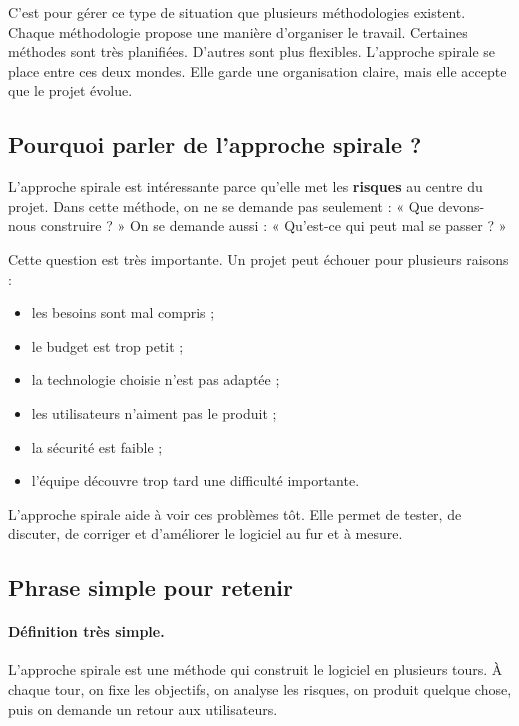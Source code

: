 \documentclass[12pt,a4paper]{article}
\newcommand{\important}[1]{\textbf{#1}}
\begin{document}
C'est pour gérer ce type de situation que plusieurs méthodologies existent. Chaque méthodologie propose une manière d'organiser le travail. Certaines méthodes sont très planifiées. D'autres sont plus flexibles. L'approche spirale se place entre ces deux mondes. Elle garde une organisation claire, mais elle accepte que le projet évolue.

\subsection{Pourquoi parler de l'approche spirale ?}

L'approche spirale est intéressante parce qu'elle met les \important{risques} au centre du projet. Dans cette méthode, on ne se demande pas seulement : « Que devons-nous construire ? » On se demande aussi : « Qu'est-ce qui peut mal se passer ? »

Cette question est très importante. Un projet peut échouer pour plusieurs raisons :

\begin{itemize}
    \item les besoins sont mal compris ;
    \item le budget est trop petit ;
    \item la technologie choisie n'est pas adaptée ;
    \item les utilisateurs n'aiment pas le produit ;
    \item la sécurité est faible ;
    \item l'équipe découvre trop tard une difficulté importante.
\end{itemize}

L'approche spirale aide à voir ces problèmes tôt. Elle permet de tester, de discuter, de corriger et d'améliorer le logiciel au fur et à mesure.

\subsection{Phrase simple pour retenir}

\paragraph{Définition très simple.}
L'approche spirale est une méthode qui construit le logiciel en plusieurs tours. À chaque tour, on fixe les objectifs, on analyse les risques, on produit quelque chose, puis on demande un retour aux utilisateurs.

\end{document}
